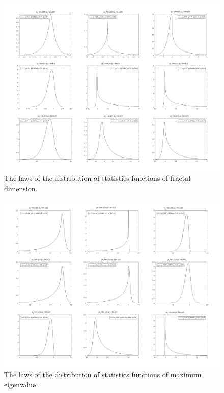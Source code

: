 \begin{figure}[h]
\setcaptionmargin{5mm}
\onelinecaptionstrue
\includegraphics[width=1.0\textwidth]{pics/fig_2.pdf}
\caption{The laws of the distribution of statistics functions of fractal dimension.}\label{fig:fig_2}
\end{figure}

\begin{figure}[h]
\setcaptionmargin{5mm}
\onelinecaptionstrue
\includegraphics[width=1.0\textwidth]{pics/fig_3.pdf}
\caption{The laws of the distribution of statistics functions of maximum eigenvalue.}\label{fig:fig_3}
\end{figure}

